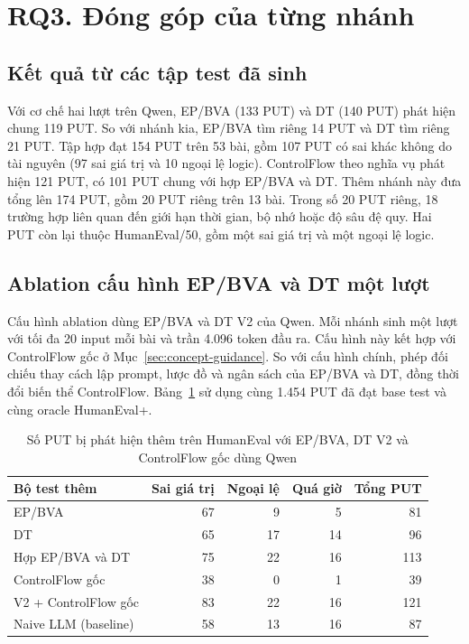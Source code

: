 \section{RQ3. Đóng góp của từng nhánh}
\label{sec:detection-results}

\subsection{Kết quả từ các tập test đã sinh}

Với cơ chế hai lượt trên Qwen, EP/BVA (133 PUT) và DT (140 PUT) phát hiện chung 119 PUT. So với nhánh kia, EP/BVA tìm riêng 14 PUT và DT tìm riêng 21 PUT. Tập hợp đạt 154 PUT trên 53 bài, gồm 107 PUT có sai khác không do tài nguyên (97 sai giá trị và 10 ngoại lệ logic). ControlFlow theo nghĩa vụ phát hiện 121 PUT, có 101 PUT chung với hợp EP/BVA và DT. Thêm nhánh này đưa tổng lên 174 PUT, gồm 20 PUT riêng trên 13 bài. Trong số 20 PUT riêng, 18 trường hợp liên quan đến giới hạn thời gian, bộ nhớ hoặc độ sâu đệ quy. Hai PUT còn lại thuộc HumanEval/50, gồm một sai giá trị và một ngoại lệ logic.

\subsection{Ablation cấu hình EP/BVA và DT một lượt}
\label{sec:ablation-one-pass}

Cấu hình ablation dùng EP/BVA và DT V2 của Qwen. Mỗi nhánh sinh một lượt với tối đa 20 input mỗi bài và trần 4.096 token đầu ra. Cấu hình này kết hợp với ControlFlow gốc ở Mục~\ref{sec:concept-guidance}. So với cấu hình chính, phép đối chiếu thay cách lập prompt, lược đồ và ngân sách của EP/BVA và DT, đồng thời đổi biến thể ControlFlow. Bảng~\ref{tab:ablation-one-pass-detections} sử dụng cùng 1.454 PUT đã đạt base test và cùng oracle HumanEval+.

\begin{table}[!htbp]
\centering
\caption[Phát hiện thêm với V2 và ControlFlow gốc dùng Qwen]{Số PUT bị phát hiện thêm trên HumanEval với EP/BVA, DT V2 và ControlFlow gốc dùng Qwen}
\label{tab:ablation-one-pass-detections}
\small
\begin{tabular*}{\linewidth}{@{\extracolsep{\fill}}lrrrr@{}}
\toprule
Bộ test thêm & Sai giá trị & Ngoại lệ & Quá giờ & Tổng PUT \\
\midrule
EP/BVA & 67 & 9 & 5 & 81 \\
DT & 65 & 17 & 14 & 96 \\
Hợp EP/BVA và DT & 75 & 22 & 16 & 113 \\
ControlFlow gốc & 38 & 0 & 1 & 39 \\
V2 + ControlFlow gốc & 83 & 22 & 16 & 121 \\
\midrule
Naive LLM (baseline) & 58 & 13 & 16 & 87 \\
\bottomrule
\end{tabular*}
\end{table}

